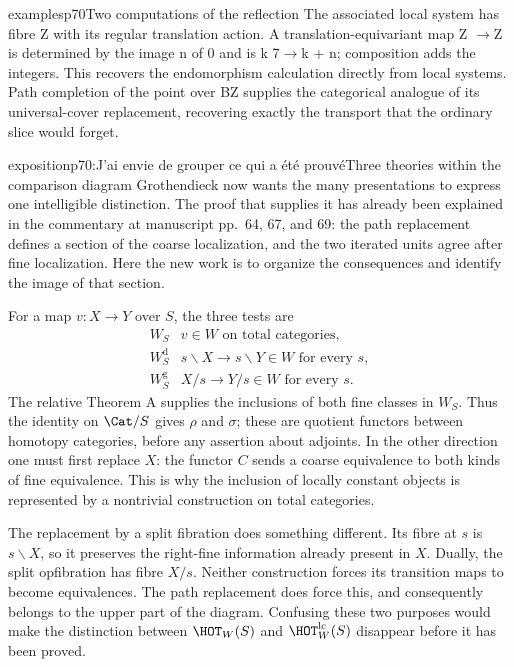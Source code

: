 \begin{dcomment}{examples}{p70}{Two computations of the reflection}
The associated local system has fibre Z with its regular translation action. A translation-equivariant map Z \ensuremath{\to}Z is determined by the image n of 0 and is k 7\ensuremath{\to}k + n; composition adds the integers. This recovers the endomorphism calculation directly from local systems. Path completion of the point over BZ supplies the categorical analogue of its universal-cover replacement, recovering exactly the transport that the ordinary slice would forget.

\end{dcomment}

\begin{dcomment}{exposition}{p70:J'ai envie de grouper ce qui a été prouvé}{Three theories within the comparison diagram}
Grothendieck now wants the many presentations to express one intelligible distinction. The proof that supplies it has already been explained in the commentary at manuscript pp.~64, 67, and 69: the path replacement defines a section of the coarse localization, and the two iterated units agree after fine localization. Here the new work is to organize the consequences and identify the image of that section.

For a map $v:X\to Y$ over $S$, the three tests are
\[
\begin{array}{c|l}
 W_S&v\in W\text{ on total categories},\\
 W_S^{\mathrm d}&s\backslash X\longrightarrow s\backslash Y\in W
                    \text{ for every }s,\\
 W_S^{\mathrm g}&X/s\longrightarrow Y/s\in W
                    \text{ for every }s.
\end{array}
\]
The relative Theorem A supplies the inclusions of both fine classes in $W_S$. Thus the identity on $\Cat/S$ gives $\rho$ and $\sigma$; these are quotient functors between homotopy categories, before any assertion about adjoints. In the other direction one must first replace $X$: the functor $C$ sends a coarse equivalence to both kinds of fine equivalence. This is why the inclusion of locally constant objects is represented by a nontrivial construction on total categories.

The replacement by a split fibration does something different. Its fibre at $s$ is $s\backslash X$, so it preserves the right-fine information already present in $X$. Dually, the split opfibration has fibre $X/s$. Neither construction forces its transition maps to become equivalences. The path replacement does force this, and consequently belongs to the upper part of the diagram. Confusing these two purposes would make the distinction between $\HOT_W(S)$ and $\HOT_W^{\mathrm{lc}}(S)$ disappear before it has been proved.


\end{dcomment}

